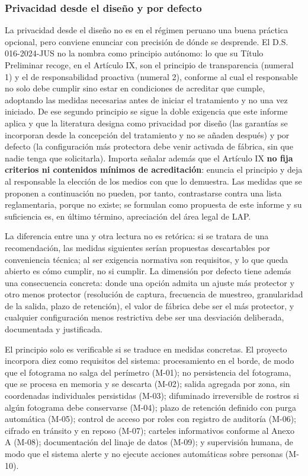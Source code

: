 \subsubsection{Privacidad desde el diseño y por defecto}

La privacidad desde el diseño no es en el régimen peruano una buena
práctica opcional, pero conviene enunciar con precisión de dónde se
desprende. El D.S. 016-2024-JUS no la nombra como principio autónomo: lo
que su Título Preliminar recoge, en el Artículo IX, son el principio de
transparencia (numeral 1) y el de responsabilidad proactiva (numeral 2),
conforme al cual el responsable no solo debe cumplir sino estar en
condiciones de acreditar que cumple, adoptando las medidas necesarias
antes de iniciar el tratamiento y no una vez iniciado. De ese segundo
principio se sigue la doble exigencia que este informe aplica y que la
literatura designa como privacidad por diseño (las garantías se
incorporan desde la concepción del tratamiento y no se añaden después) y
por defecto (la configuración más protectora debe venir activada de
fábrica, sin que nadie tenga que solicitarla). Importa señalar además
que el Artículo IX \textbf{no fija criterios ni contenidos mínimos de
acreditación}: enuncia el principio y deja al responsable la elección de
los medios con que lo demuestra. Las medidas que se proponen a
continuación no pueden, por tanto, contrastarse contra una lista
reglamentaria, porque no existe; se formulan como propuesta de este
informe y su suficiencia es, en último término, apreciación del área
legal de LAP.

La diferencia entre una y otra lectura no es retórica: si se tratara de
una recomendación, las medidas siguientes serían propuestas descartables
por conveniencia técnica; al ser exigencia normativa son requisitos, y
lo que queda abierto es cómo cumplir, no si cumplir. La dimensión por
defecto tiene además una consecuencia concreta: donde una opción admita
un ajuste más protector y otro menos protector (resolución de captura,
frecuencia de muestreo, granularidad de la salida, plazo de retención),
el valor de fábrica debe ser el más protector, y cualquier configuración
menos restrictiva debe ser una desviación deliberada, documentada y
justificada.

El principio solo es verificable si se traduce en medidas concretas. El
proyecto incorpora diez como requisitos del sistema: procesamiento en el
borde, de modo que el fotograma no salga del perímetro (M-01); no
persistencia del fotograma, que se procesa en memoria y se descarta
(M-02); salida agregada por zona, sin coordenadas individuales
persistidas (M-03); difuminado irreversible de rostros si algún
fotograma debe conservarse (M-04); plazo de retención definido con purga
automática (M-05); control de acceso por roles con registro de auditoría
(M-06); cifrado en tránsito y en reposo (M-07); carteles informativos
conforme al Anexo A (M-08); documentación del linaje de datos (M-09); y
supervisión humana, de modo que el sistema alerte y no ejecute acciones
automáticas sobre personas (M-10).

